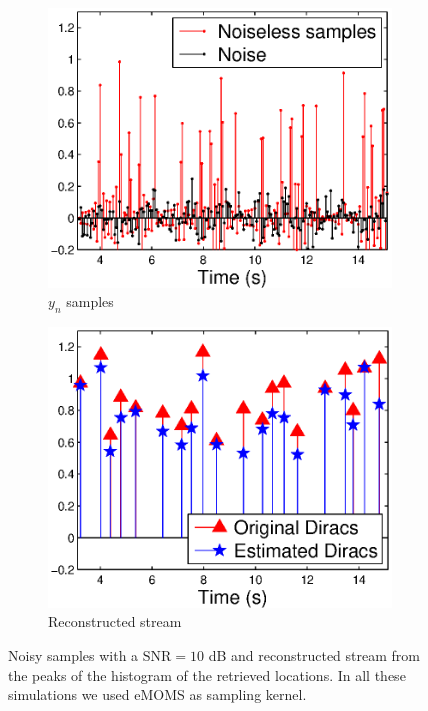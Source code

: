 \documentclass{article}
\begin{document}
\begin{figure}[t]
\centering
\begin{subfigure}{.22\textwidth}
\includegraphics[width=\linewidth]{figures/noisy_samples}
\caption{$y_n$ samples}
\end{subfigure}
\begin{subfigure}{.22\textwidth}
\includegraphics[width=\linewidth]{figures/noisy_reconstr}
\caption{Reconstructed stream}
\end{subfigure}
\caption{Noisy samples with a $\mathrm{SNR}=10$ dB and reconstructed stream 
from the peaks of the histogram of the retrieved locations. 
In all these simulations we used eMOMS as sampling kernel.}
\label{fig:noisy_reconstr}
\end{figure}
\end{document}
